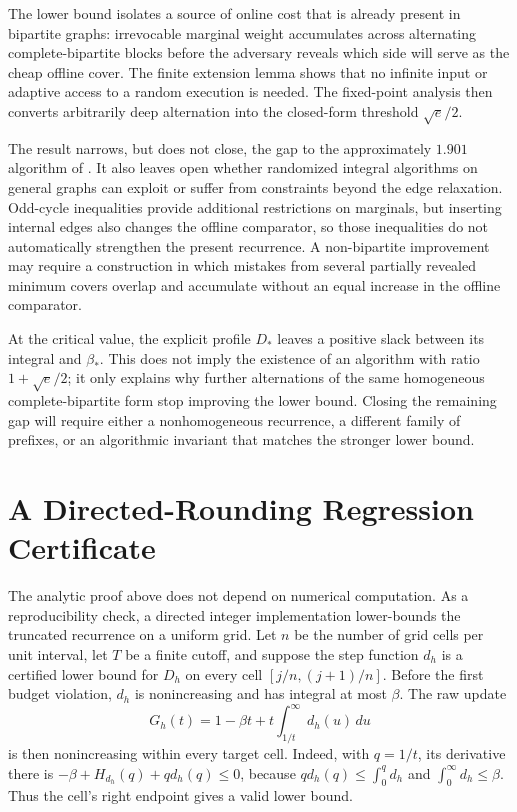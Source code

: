 \documentclass[11pt,letterpaper]{article}
\theoremstyle{definition}
\theoremstyle{remark}
\begin{document}
The lower bound isolates a source of online cost that is already present in bipartite graphs: irrevocable marginal weight accumulates across alternating complete-bipartite blocks before the adversary reveals which side will serve as the cheap offline cover.
The finite extension lemma shows that no infinite input or adaptive access to a random execution is needed.
The fixed-point analysis then converts arbitrarily deep alternation into the closed-form threshold $\sqrt e/2$.

The result narrows, but does not close, the gap to the approximately $1.901$ algorithm of \citet{WangWong2015}.
It also leaves open whether randomized integral algorithms on general graphs can exploit or suffer from constraints beyond the edge relaxation.
Odd-cycle inequalities provide additional restrictions on marginals, but inserting internal edges also changes the offline comparator, so those inequalities do not automatically strengthen the present recurrence.
A non-bipartite improvement may require a construction in which mistakes from several partially revealed minimum covers overlap and accumulate without an equal increase in the offline comparator.

At the critical value, the explicit profile $D_*$ leaves a positive slack between its integral and $\beta_*$.
This does not imply the existence of an algorithm with ratio $1+\sqrt e/2$; it only explains why further alternations of the same homogeneous complete-bipartite form stop improving the lower bound.
Closing the remaining gap will require either a nonhomogeneous recurrence, a different family of prefixes, or an algorithmic invariant that matches the stronger lower bound.

\appendix

\section{A Directed-Rounding Regression Certificate}\label{app:certificate}

The analytic proof above does not depend on numerical computation.
As a reproducibility check, a directed integer implementation lower-bounds the truncated recurrence on a uniform grid.
Let $n$ be the number of grid cells per unit interval, let $T$ be a finite cutoff, and suppose the step function $d_h$ is a certified lower bound for $D_h$ on every cell $[j/n,(j+1)/n]$.
Before the first budget violation, $d_h$ is nonincreasing and has integral at most $\beta$.
The raw update
\begin{equation}\label{eq:raw-update} G_h(t)=1-\beta t+t\int_{1/t}^{\infty}d_h(u)\,du \end{equation}
is then nonincreasing within every target cell.
Indeed, with $q=1/t$, its derivative there is $-\beta+H_{d_h}(q)+q d_h(q)\le0$, because $q d_h(q)\le\int_0^q d_h$ and $\int_0^\infty d_h\le\beta$.
Thus the cell's right endpoint gives a valid lower bound.
\end{document}
